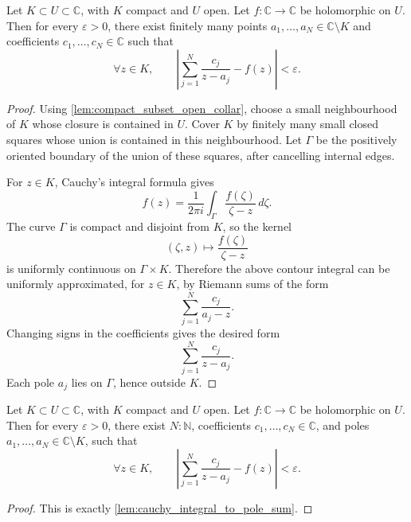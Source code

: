 \documentclass[a4paper]{article}
\newcommand{\C}{\mathbb{C}}
\newcommand{\eps}{\varepsilon}
\begin{document}
\begin{lemma}
\label{lem:cauchy_integral_to_pole_sum}
Let \(K \subset U \subset \C\), with \(K\) compact and \(U\) open. Let
\(f : \C \to \C\) be holomorphic on \(U\). Then for every \(\eps > 0\), there
exist finitely many points \(a_1,\dots,a_N \in \C \setminus K\) and coefficients
\(c_1,\dots,c_N \in \C\) such that
\[
  \forall z \in K,\qquad
  \left|
    \sum_{j=1}^N \frac{c_j}{z-a_j} - f(z)
  \right| < \eps .
\]
\end{lemma}

\begin{proof}
Using \cref{lem:compact_subset_open_collar}, choose a small neighbourhood of
\(K\) whose closure is contained in \(U\). Cover \(K\) by finitely many small
closed squares whose union is contained in this neighbourhood. Let \(\Gamma\)
be the positively oriented boundary of the union of these squares, after
cancelling internal edges.

For \(z \in K\), Cauchy's integral formula gives
\[
  f(z)
  =
  \frac{1}{2\pi i}
  \int_\Gamma \frac{f(\zeta)}{\zeta-z}\,d\zeta .
\]
The curve \(\Gamma\) is compact and disjoint from \(K\), so the kernel
\[
  (\zeta,z) \mapsto \frac{f(\zeta)}{\zeta-z}
\]
is uniformly continuous on \(\Gamma \times K\). Therefore the above contour
integral can be uniformly approximated, for \(z \in K\), by Riemann sums of the
form
\[
  \sum_{j=1}^N \frac{c_j}{a_j-z}.
\]
Changing signs in the coefficients gives the desired form
\[
  \sum_{j=1}^N \frac{c_j}{z-a_j}.
\]
Each pole \(a_j\) lies on \(\Gamma\), hence outside \(K\).
\end{proof}

\begin{proposition}
\label{prop:rational_approximation}
Let \(K \subset U \subset \C\), with \(K\) compact and \(U\) open. Let
\(f : \C \to \C\) be holomorphic on \(U\). Then for every \(\eps > 0\), there
exist \(N : \mathbb{N}\), coefficients \(c_1,\dots,c_N \in \C\), and poles
\(a_1,\dots,a_N \in \C \setminus K\), such that
\[
  \forall z \in K,\qquad
  \left|
    \sum_{j=1}^N \frac{c_j}{z-a_j} - f(z)
  \right| < \eps .
\]
\end{proposition}

\begin{proof}
This is exactly \cref{lem:cauchy_integral_to_pole_sum}.
\end{proof}
\end{document}
